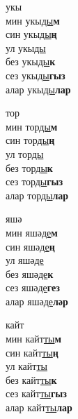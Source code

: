 \begin{multicols}{4}
\begin{enumerate}
\begin{minipage}{\linewidth}
    \item
    укы\\
    мин укы\underline{ды}\textbf{м}\\
    син укы\underline{ды}\textbf{ң}\\
    ул укы\underline{ды}\\
    без укы\underline{ды}\textbf{к}\\
    сез укы\underline{ды}\textbf{гыз}\\
    алар укы\underline{ды}\textbf{лар}\\
\end{minipage}

\begin{minipage}{\linewidth}
    \item
    тор\\
    мин тор\underline{ды}\textbf{м}\\
    син тор\underline{ды}\textbf{ң}\\
    ул тор\underline{ды}\\
    без тор\underline{ды}\textbf{к}\\
    сез тор\underline{ды}\textbf{гыз}\\
    алар тор\underline{ды}\textbf{лар}\\
\end{minipage}

\begin{minipage}{\linewidth}
    \item
    яшә\\
    мин яшә\underline{де}\textbf{м}\\
    син яшә\underline{де}\textbf{ң}\\
    ул яшә\underline{де}\\
    без яшә\underline{де}\textbf{к}\\
    сез яшә\underline{де}\textbf{гез}\\
    алар яшә\underline{де}\textbf{ләр}\\
\end{minipage}

\begin{minipage}{\linewidth}
    \item
    кайт\\
    мин кайт\underline{ты}\textbf{м}\\
    син кайт\underline{ты}\textbf{ң}\\
    ул кайт\underline{ты}\\
    без кайт\underline{ты}\textbf{к}\\
    сез кайт\underline{ты}\textbf{гыз}\\
    алар кайт\underline{ты}\textbf{лар}\\
\end{minipage}


\end{enumerate}
\end{multicols}
